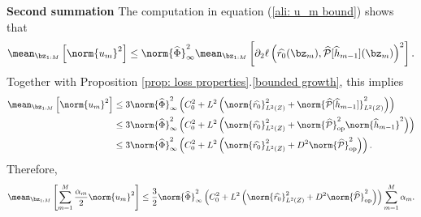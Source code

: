 \textbf{Second summation }
The computation in equation (\ref{ali: u_m bound}) shows that
\begin{align*}
    \mean_{ \bz_{ 1:M } } \left[
        \norm{ u_{ m } }^2
    \right]
    \leq \norm{ \hat{ \Phi } }^2_{ \infty } \mean_{ \bz_{ 1:M } } \left[
        \partial_{ 2 } \ell \left(
            \hat{ r_{ 0 } } ( \bz_{ m } ),
            \hat{ \meanop } [ \hat{ h }_{ m-1 } ] ( \bz_{ m } )
        \right)^2
    \right]
.\end{align*}
Together with Proposition \ref{prop: loss properties}.\ref{bounded growth}, this implies
\begin{align*}
    \mean_{ \bz_{ 1:M } } \left[
        \norm{ u_{ m } }^2
    \right]
    &\leq 3 \norm{ \hat{ \Phi } }^2_{ \infty } 
    \left(
        C_{ 0 }^2 + L^2 \left(
            \norm{ \hat{ r_{ 0 } } }_{ L^2 ( Z ) }^2
            + \norm{ \hat{ \meanop } [ \hat{ h }_{ m-1 } ] }_{ L^2 ( Z ) }^2
        \right)
    \right) \\
    &\leq 3 \norm{ \hat{ \Phi } }^2_{ \infty }
    \left(
        C_{ 0 }^2 + L^2 \left(
            \norm{ \hat{ r_{ 0 } } }_{ L^2 ( Z ) }^2
            + \norm{ \hat{ \meanop } }_{ \op }^2 \norm{ \hat{ h }_{ m-1 } }^2
        \right)
    \right) \\
    &\leq 3 \norm{ \hat{ \Phi } }^2_{ \infty }
    \left(
        C_{ 0 }^2 + L^2 \left(
            \norm{ \hat{ r_{ 0 } } }_{ L^2 ( Z ) }^2
            + D^2 \norm{ \hat{ \meanop } }_{ \op }^2
        \right)
    \right)
.\end{align*}
Therefore,
\begin{equation*}
    \mean_{ \bz_{ 1:M } } \left[
        \sum_{ m=1 }^{ M } \frac{ \alpha_{ m } }{ 2 } \norm{ u_{ m } }^2
    \right]
    \leq
    \frac{ 3 }{ 2 } \norm{ \hat{ \Phi } }^2_{ \infty }
    \left(
        C_{ 0 }^2 + L^2 \left(
            \norm{ \hat{ r_{ 0 } } }_{ L^2 ( Z ) }^2
            + D^2 \norm{ \hat{ \meanop } }_{ \op }^2
        \right)
    \right)
    \sum_{ m=1 }^{ M } \alpha_{ m }
.\end{equation*}



